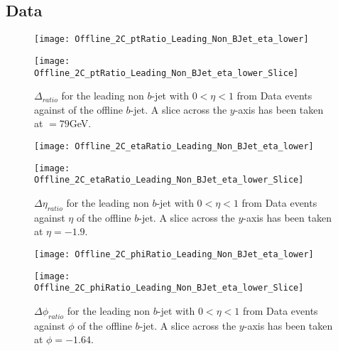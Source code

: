 \newpage
		\subsection{Data}
		
		
		\begin{figure}[h]
			\centering
			\begin{minipage}[h]{0.33\linewidth}
				\texttt{[image: Offline\_2C\_ptRatio\_Leading\_Non\_BJet\_eta\_lower]}
				
			\end{minipage}
			\quad
			\begin{minipage}[h]{0.33\linewidth}
				\texttt{[image: Offline\_2C\_ptRatio\_Leading\_Non\_BJet\_eta\_lower\_Slice]}
			\end{minipage}
			\caption{$\Delta $\pt$_{ratio}$ for the leading \pt non $b$-jet with $0 < \eta < 1$ from Data events against \pt of the offline $b$-jet. A slice across the $y$-axis has been taken at \pt$=79$GeV. }
			\label{fig:D:leadingnonbptcentral}
		\end{figure}
		
		\begin{figure}[h]
			\centering
			
			\begin{minipage}[h]{0.33\linewidth}
				\texttt{[image: Offline\_2C\_etaRatio\_Leading\_Non\_BJet\_eta\_lower]}
			\end{minipage}
			\quad
			\begin{minipage}[h]{0.33\linewidth}
				\texttt{[image: Offline\_2C\_etaRatio\_Leading\_Non\_BJet\_eta\_lower\_Slice]}
			\end{minipage}
			\caption{$\Delta \eta_{ratio}$ for the leading \pt non $b$-jet with $0 < \eta < 1$ from Data events against $\eta$ of the offline $b$-jet. A slice across the $y$-axis has been taken at $\eta=-1.9$. }
			\label{fig:D:leadingnonbetacentral}
		\end{figure}
		
		\begin{figure}[h]
			\centering
			
			\begin{minipage}[h]{0.33\linewidth}
				\texttt{[image: Offline\_2C\_phiRatio\_Leading\_Non\_BJet\_eta\_lower]}
			\end{minipage}
			\quad
			\begin{minipage}[h]{0.33\linewidth}
				\texttt{[image: Offline\_2C\_phiRatio\_Leading\_Non\_BJet\_eta\_lower\_Slice]}
			\end{minipage}
			\caption{$\Delta \phi_{ratio}$ for the leading \pt non $b$-jet with $0 < \eta < 1$ from Data events against $\phi$ of the offline $b$-jet. A slice across the $y$-axis has been taken at $\phi=-1.64$. }
			\label{fig:D:leadingnonbphicentral}
		\end{figure}
		
